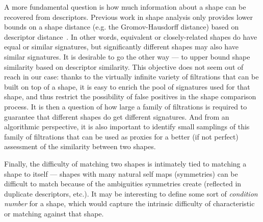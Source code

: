 A more fundamental question is how much information about a shape can
be recovered from descriptors. Previous work in shape analysis only
provides lower bounds on a shape distance (e.g. the Gromov-Hausdorff
distance) based on descriptor distance~\cite{survey-on-signatures}. In
other words, equivalent or closely-related shapes do have equal or
similar signatures, but significantly different shapes may also have
similar signatures. It is desirable to go the other way --- to upper
bound shape similarity based on descriptor similarity. This objective
does not seem out of reach in our case: thanks to the virtually
infinite variety of filtrations that can be built on top of a shape,
it is easy to enrich the pool of signatures used for that shape, and
thus restrict the possibility of false positives in the shape
comparison process. It is then a question of how large a family of
filtrations is required to guarantee that different shapes do get
different signatures. And from an algorithmic perspective, it is also
important to identify small samplings of this family of filtrations
that can be used as proxies for a better (if not perfect) assessment
of the similarity between two shapes.

Finally, the difficulty of matching two shapes is
intimately tied to matching a shape to itself --- shapes with many
natural self maps (symmetries) can be difficult to match because of
the ambiguities symmetries create (reflected in duplicate descriptors,
etc.). It may be interesting to define some sort of {\em condition
  number} for a shape, which would capture the intrinsic difficulty of
characteristic or matching against that shape.



